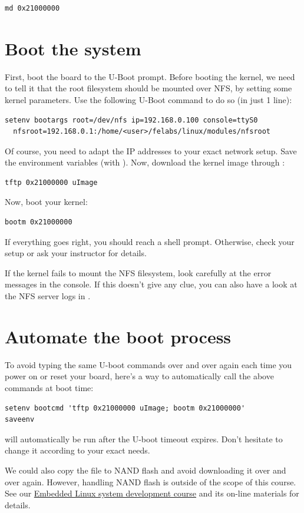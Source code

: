 \begin{verbatim}
md 0x21000000
\end{verbatim}

\section{Boot the system}

First, boot the board to the U-Boot prompt.  Before booting the
kernel, we need to tell it that the root filesystem should be mounted
over NFS, by setting some kernel parameters.  Use the following U-Boot
command to do so (in just 1 line):

\scriptsize
\begin{verbatim}
setenv bootargs root=/dev/nfs ip=192.168.0.100 console=ttyS0
  nfsroot=192.168.0.1:/home/<user>/felabs/linux/modules/nfsroot
\end{verbatim}
\normalsize

Of course, you need to adapt the IP addresses to your exact network
setup. Save the environment variables (with ).  Now, download
the kernel image through :

\begin{verbatim}
tftp 0x21000000 uImage
\end{verbatim}

Now, boot your kernel:

\begin{verbatim}
bootm 0x21000000
\end{verbatim}

If everything goes right, you should reach a shell prompt. Otherwise,
check your setup or ask your instructor for details.

If the kernel fails to mount the NFS filesystem, look carefully at the
error messages in the console. If this doesn't give any clue, you can
also have a look at the NFS server logs in .

\section{Automate the boot process}

To avoid typing the same U-boot commands over and over again each time
you power on or reset your board, here's a way to automatically call the
above commands at boot time:

\begin{verbatim}
setenv bootcmd 'tftp 0x21000000 uImage; bootm 0x21000000'
saveenv
\end{verbatim}

 will automatically be run after the U-boot timeout
expires. Don't hesitate to change it according to your exact needs.

We could also copy the  file to NAND flash and avoid
downloading it over and over again. However, handling NAND flash is
outside of the scope of this course. See our
\href{http://free-electrons.com/training/embedded-linux/}{Embedded
Linux system development course} and its on-line materials for details.
